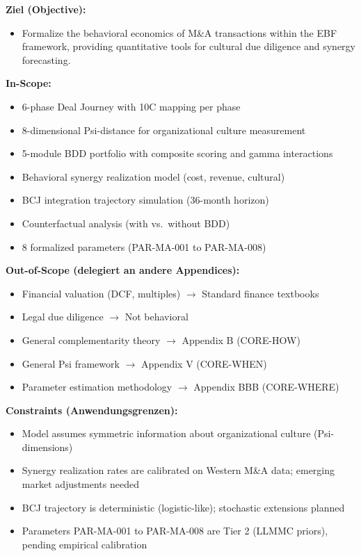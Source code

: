 \begin{tcolorbox}[
    colback=orange!5!white,
    colframe=orange!75!black,
    title={\textbf{Appendix Scope: Ziel / In-Scope / Out-of-Scope / Constraints}},
    fonttitle=\bfseries
]

\textbf{Ziel (Objective):}
\begin{itemize}[nosep]
    \item Formalize the behavioral economics of M\&A transactions within the EBF framework,
          providing quantitative tools for cultural due diligence and synergy forecasting.
\end{itemize}

\textbf{In-Scope:}
\begin{itemize}[nosep]
    \item 6-phase Deal Journey with 10C mapping per phase
    \item 8-dimensional Psi-distance for organizational culture measurement
    \item 5-module BDD portfolio with composite scoring and gamma interactions
    \item Behavioral synergy realization model (cost, revenue, cultural)
    \item BCJ integration trajectory simulation (36-month horizon)
    \item Counterfactual analysis (with vs.\ without BDD)
    \item 8 formalized parameters (PAR-MA-001 to PAR-MA-008)
\end{itemize}

\textbf{Out-of-Scope (delegiert an andere Appendices):}
\begin{itemize}[nosep]
    \item Financial valuation (DCF, multiples) $\rightarrow$ Standard finance textbooks
    \item Legal due diligence $\rightarrow$ Not behavioral
    \item General complementarity theory $\rightarrow$ Appendix B (CORE-HOW)
    \item General Psi framework $\rightarrow$ Appendix V (CORE-WHEN)
    \item Parameter estimation methodology $\rightarrow$ Appendix BBB (CORE-WHERE)
\end{itemize}

\textbf{Constraints (Anwendungsgrenzen):}
\begin{itemize}[nosep]
    \item Model assumes symmetric information about organizational culture (Psi-dimensions)
    \item Synergy realization rates are calibrated on Western M\&A data; emerging market adjustments needed
    \item BCJ trajectory is deterministic (logistic-like); stochastic extensions planned
    \item Parameters PAR-MA-001 to PAR-MA-008 are Tier 2 (LLMMC priors), pending empirical calibration
\end{itemize}


\end{tcolorbox}
